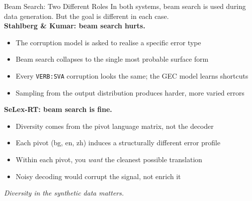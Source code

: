 \documentclass[aspectratio=169]{beamer}
\newcommand{\errtag}[1]{\texttt{#1}}
\begin{document}
\begin{frame}{Beam Search: Two Different Roles}
  In both systems, beam search is used during data generation.
  But the goal is different in each case.\\[1.5em]

  \textbf{Stahlberg \& Kumar: beam search hurts.}
  \begin{itemize}
    \item The corruption model is asked to realise a specific error type
    \item Beam search collapses to the single most probable surface form
    \item Every \errtag{VERB:SVA} corruption looks the same; the GEC model learns shortcuts
    \item Sampling from the output distribution produces harder, more varied errors
  \end{itemize}

  \vspace{1em}
  \textbf{SeLex-RT: beam search is fine.}
  \begin{itemize}
    \item Diversity comes from the pivot language matrix, not the decoder
    \item Each pivot (bg, en, zh) induces a structurally different error profile
    \item Within each pivot, you \emph{want} the cleanest possible translation
    \item Noisy decoding would corrupt the signal, not enrich it
  \end{itemize}

  \vspace{1em}
 \textit{Diversity in the synthetic data matters.}
\end{frame}
\end{document}
